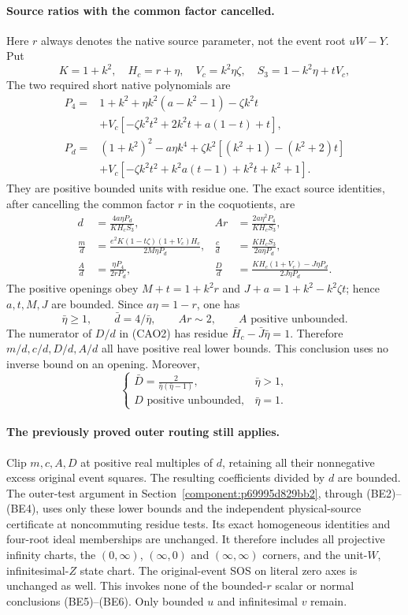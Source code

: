 \paragraph{Source ratios with the common factor cancelled.}
Here $r$ always denotes the native source parameter, not the event root
$uW-Y$. Put
\[
 K=1+k^2,\quad H_c=r+\eta,\quad V_c=k^2\eta\zeta,\quad
 S_3=1-k^2\eta+tV_c,
\]
The two required short native polynomials are
\begin{align*}
P_4={}&1+k^2+\eta k^2(a-k^2-1)-\zeta k^2t\\
 &+V_c[-\zeta k^2t^2+2k^2t+a(1-t)+t],\\
P_d={}&(1+k^2)^2-a\eta k^4
 +\zeta k^2[(k^2+1)-(k^2+2)t]\\
 &+V_c[-\zeta k^2t^2+k^2a(t-1)+k^2t+k^2+1].
\end{align*}
They are positive bounded units with residue one. The exact source
identities, after cancelling the common factor $r$ in the coquotients,
are
\begin{align*}
 d&=\frac{4a\eta P_d}{KH_cS_3},&
 Ar&=\frac{2a\eta^2P_4}{KH_cS_3},\\
 \frac md&=\frac{e^2K(1-t\zeta)(1+V_c)H_c}{2M\eta P_d},&
 \frac cd&=\frac{KH_cS_3}{2a\eta P_d},\\
 \frac Ad&=\frac{\eta P_4}{2rP_d},&
 \frac Dd&=\frac{KH_c(1+V_c)-J\eta P_d}{2J\eta P_d}.
 \tag{CAO2}
\end{align*}
The positive openings obey
$M+t=1+k^2r$ and $J+a=1+k^2-k^2\zeta t$; hence $a,t,M,J$ are
bounded. Since $a\eta=1-r$, one has
\[
 \bar\eta\ge1,\qquad \bar d=4/\bar\eta,\qquad Ar\sim2,
 \qquad A\text{ positive unbounded}.
 \tag{CAO3}
\]
The numerator of $D/d$ in (CAO2) has residue
$\bar H_c-\bar J\bar\eta=1$. Therefore $m/d,c/d,D/d,A/d$ all have
positive real lower bounds. This conclusion uses no inverse bound on
an opening. Moreover,
\[
 \begin{cases}
 \displaystyle \bar D=\frac{2}{\bar\eta(\bar\eta-1)},
       &\bar\eta>1,\\[4pt]
 D\text{ positive unbounded},&\bar\eta=1.
 \end{cases}
 \tag{CAO4}
\]

\paragraph{The previously proved outer routing still applies.}
Clip $m,c,A,D$ at positive real multiples of $d$, retaining all their
nonnegative excess original event squares. The resulting coefficients
divided by $d$ are bounded. The outer-test argument in
Section~\ref{component:p69995d829bb2}, through (BE2)--(BE4), uses only
these lower bounds and the independent physical-source certificate at
noncommuting residue tests. Its exact homogeneous identities and
four-root ideal memberships are unchanged. It therefore includes all
projective infinity charts, the $(0,\infty)$, $(\infty,0)$ and
$(\infty,\infty)$ corners, and the unit-$W$, infinitesimal-$Z$ state
chart. The original-event SOS on literal zero axes is unchanged as
well. This invokes none of the bounded-$r$ scalar or normal conclusions
(BE5)--(BE6). Only bounded $u$ and infinitesimal $v$ remain.

